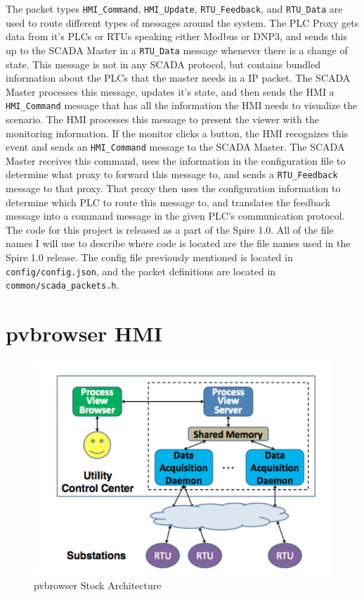 \documentclass[oneside,11pt,a4paper,oldfontcommands]{book}
\def\code#1{\texttt{#1}}
\begin{document}
\indent
The packet types \code{HMI\_Command}, \code{HMI\_Update}, \code{RTU\_Feedback},
and \code{RTU\_Data} are used to route different types of messages
around the system.
The PLC Proxy gets data from it's PLCs or RTUs speaking either Modbus or DNP3,
and sends this up to the
SCADA Master in a \code{RTU\_Data} message whenever there is a change of state.
This message is not in any SCADA
protocol, but contains bundled information about the PLCs that the master
needs in a IP packet. The SCADA Master processes this message, updates it's state, and then sends the
HMI a \code{HMI\_Command} message that has all the information the HMI needs
to visualize the scenario. The HMI processes this message to present the viewer with
the monitoring information. If the monitor clicks a button, the HMI 
recognizes this event and sends an \code{HMI\_Command} message to the SCADA Master.
The SCADA Master receives this command, uses the information in the configuration 
file to determine what proxy to forward
this message to, and sends a \code{RTU\_Feedback} message to that proxy. 
That proxy then uses
the configuration information to determine which PLC to route this message to, and translates
the feedback message into a command message in the given PLC's communication
protocol. \\

\indent    
The code for this project is released as a part of the Spire 1.0. All of the
file names I will use to describe where code is located are the file names
used in the Spire 1.0 release. The config file previously mentioned is located
in \code{config/config.json}, and the packet definitions are located in
\code{common/scada\_packets.h}. \\


\section{pvbrowser HMI}

\begin{figure}[ht]
  \begin{center}
  \includegraphics{pvb_architecture}
  \caption{pvbrowser Stock Architecture \cite{towardsscada}}
  \label{fig:3}
  \end{center}
\end{figure}
\end{document}
